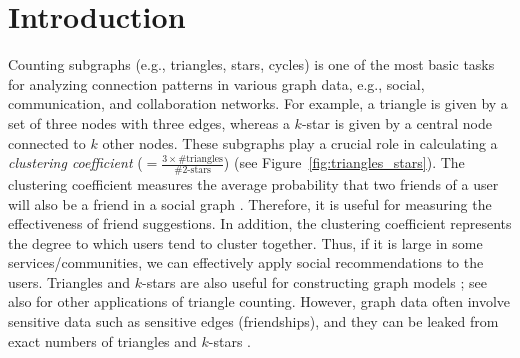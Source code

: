 \section{Introduction}
\label{sec:intro}
Counting subgraphs (e.g., triangles, stars, cycles) is
one of the most basic tasks 
for analyzing connection patterns
in
various graph data, e.g., social,
communication, and collaboration networks.
For example,
a triangle is given by a set of three nodes with three edges, whereas a $k$-star is given by a central node connected to $k$ other nodes.
These subgraphs
play a crucial role in calculating
a \textit{clustering coefficient} ($=\frac{3 \times \text{\#triangles}}{\text{\#2-stars}}$) (see Figure~\ref{fig:triangles_stars}). 
The clustering coefficient 
measures the average probability that
two friends of a user will also be a friend
in a social graph \cite{Newman_PRL09}. 
Therefore, it is useful for measuring the effectiveness of friend suggestions. 
In addition, the clustering coefficient represents the degree to which users tend to cluster together. 
Thus, if it is large in some services/communities, we can effectively apply social recommendations \cite{Kolluri_CCS21} to the users. 
Triangles 
and $k$-stars 
are also useful for 
constructing
graph models
\cite{Robins_SN07,Jorgensen_SIGMOD16}; 
see also \cite{Tsourakakis_JGAA11} for other applications of triangle counting. 
However, graph data often involve sensitive data such as sensitive edges (friendships),
and they 
can be leaked from 
exact numbers of triangles and $k$-stars \cite{Imola_USENIX21}.


